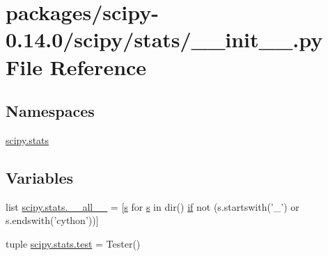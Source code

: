 \hypertarget{packages_2scipy-0_814_80_2scipy_2stats_2____init_____8py}{}\section{packages/scipy-\/0.14.0/scipy/stats/\+\_\+\+\_\+init\+\_\+\+\_\+.py File Reference}
\label{packages_2scipy-0_814_80_2scipy_2stats_2____init_____8py}
\subsection*{Namespaces}
\begin{DoxyCompactItemize}
\item 
 \hyperlink{namespacescipy_1_1stats}{scipy.\+stats}
\end{DoxyCompactItemize}
\subsection*{Variables}
\begin{DoxyCompactItemize}
\item 
list \hyperlink{namespacescipy_1_1stats_aedec9811e2f47e4a4ec3a0f4ca61ad7f}{scipy.\+stats.\+\_\+\+\_\+all\+\_\+\+\_\+} = \mbox{[}\hyperlink{indexexpr_8h_ae024b0db549122b44c349ae28ec990dc}{s} for \hyperlink{indexexpr_8h_ae024b0db549122b44c349ae28ec990dc}{s} in dir() \hyperlink{minmax_8h_a30a0ee9fee303f01d9c5e6f669e0dfe9}{if} not (s.\+startswith('\+\_\+') or s.\+endswith('cython'))\mbox{]}
\item 
tuple \hyperlink{namespacescipy_1_1stats_a5d5d5b15ae3ec7287f266c00c86df9b1}{scipy.\+stats.\+test} = Tester()
\end{DoxyCompactItemize}
